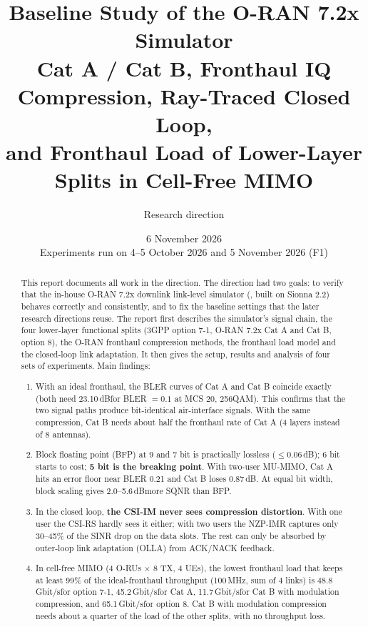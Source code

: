 \documentclass[11pt,a4paper]{article}
\title{Baseline Study of the O-RAN 7.2x Simulator\\[6pt]
  \large Cat A / Cat B, Fronthaul IQ Compression, Ray-Traced Closed Loop,\\
  and Fronthaul Load of Lower-Layer Splits in Cell-Free MIMO}
\author{Research direction \code{studies/oran_baseline}}
\date{6 November 2026\\[2pt]\small Experiments run on 4--5 October 2026 and 5 November 2026 (F1)}
\DeclareRobustCommand{\code}[1]{\codeurl{#1}}  %
\newcommand{\dB}{\,dB}
\newcommand{\Gbps}{\,Gbit/s}
\begin{document}
\maketitle

\begin{abstract}
This report documents all work in the \code{studies/oran_baseline} direction. The direction had two goals: to verify that
the in-house O-RAN 7.2x downlink link-level simulator (\code{oran/}, built on Sionna 2.2) behaves correctly and consistently,
and to fix the baseline settings that the later research directions reuse. The report first describes the simulator's
signal chain, the four lower-layer functional splits (3GPP option 7-1, O-RAN 7.2x Cat A and Cat B, option 8), the O-RAN
fronthaul compression methods, the fronthaul load model and the closed-loop link adaptation. It then gives the setup, results
and analysis of four sets of experiments. Main findings:
\begin{enumerate}[leftmargin=*]
  \item With an ideal fronthaul, the BLER curves of Cat A and Cat B coincide exactly (both need 23.10\dB for BLER $=0.1$ at MCS 20,
        256QAM). This confirms that the two signal paths produce bit-identical air-interface signals. With the same compression,
        Cat B needs about half the fronthaul rate of Cat A (4 layers instead of 8 antennas).
  \item Block floating point (BFP) at 9 and 7 bit is practically lossless ($\le 0.06$\dB); 6 bit starts to cost; \textbf{5 bit is
        the breaking point}. With two-user MU-MIMO, Cat A hits an error floor near BLER 0.21 and Cat B loses 0.87\dB. At equal
        bit width, block scaling gives 2.0--5.6\dB more SQNR than BFP.
  \item In the closed loop, \textbf{the CSI-IM never sees compression distortion}. With one user the CSI-RS hardly sees it either;
        with two users the NZP-IMR captures only 30--45\% of the SINR drop on the data slots. The rest can only be absorbed by
        outer-loop link adaptation (OLLA) from ACK/NACK feedback.
  \item In cell-free MIMO (4 O-RUs $\times$ 8 TX, 4 UEs), the lowest fronthaul load that keeps at least 99\% of the ideal-fronthaul
        throughput (100\,MHz, sum of 4 links) is 48.8\Gbps for option 7-1, 45.2\Gbps for Cat A, 11.7\Gbps for Cat B with
        modulation compression, and 65.1\Gbps for option 8. Cat B with modulation compression needs about a quarter of the
        load of the other splits, with no throughput loss.
\end{enumerate}
\end{abstract}
\end{document}
